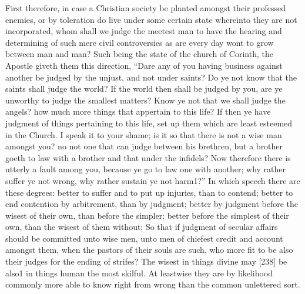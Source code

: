 First therefore, in case a Christian society be planted amongst their professed enemies, or by toleration do live under some certain state whereinto they are not incorporated, whom shall we judge the meetest man to have the hearing and determining of such mere civil controversies as are every day wont to grow between man and man? Such being the state of the church of Corinth, the Apostle giveth them this direction, “Dare any of you having business against another be judged by the unjust, and not under saints? Do ye not know that the saints shall judge the world? If the world then shall be judged by you, are ye unworthy to judge the smallest matters? Know ye not that we shall judge the angels? how much more things that appertain to this life? If then ye have judgment of things pertaining to this life, set up them which are least esteemed in the Church. I speak it to your shame; is it so that there is not a wise man amongst you? no not one that can judge between his brethren, but a brother goeth to law with a brother and that under the infidels? Now therefore there is utterly a fault among you, because ye go to law one with another; why rather suffer ye not wrong, why rather sustain ye not harm1?” In which speech there are these degrees: better to suffer and to put up injuries, than to contend; better to end contention by arbitrement, than by judgment; better by judgment before the wisest of their own, than before the simpler; better before the simplest of their own, than the wisest of them without; So that if judgment of secular affairs should be committed unto wise men, unto men of chiefest credit and account amongst them, when the pastors of their souls are such, who more fit to be also their judges for the ending of strifes? The wisest in things divine may [238] be also1 in things human the most skilful. At leastwise they are by likelihood commonly more able to know right from wrong than the common unlettered sort.

